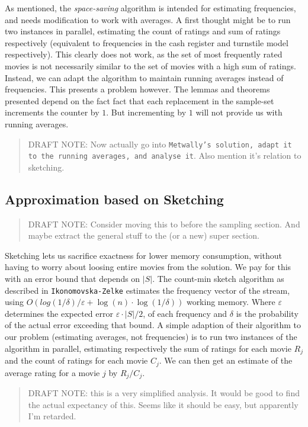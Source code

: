 As mentioned, the \textit{space-saving} algorithm is intended for
estimating frequencies, and needs modification to work with averages. A first
thought might be to run two instances in parallel, estimating the count of
ratings and sum of ratings respectively (equivalent to frequencies in the cash
register and turnstile model respectively). This clearly does not work, as the
set of most frequently rated movies is not necessarily similar to the set of
movies with a high sum of ratings. Instead, we can adapt the algorithm to
maintain running averages instead of frequencies. This presents a problem
however. The lemmas and theorems presented depend on the fact fact that each
replacement in the sample-set increments the counter by $1$. But incrementing by
$1$ will not provide us with running averages.

\begin{quote}
	DRAFT NOTE: Now actually go into \texttt{Metwally's solution, adapt it
	to the running averages, and analyse it}.
	Also mention it's relation to sketching.
\end{quote}

\subsection*{Approximation based on Sketching}

\begin{quote}
	DRAFT NOTE: Consider moving this to before the sampling section.
	And maybe extract the general stuff to the (or a new) super section.
\end{quote}
Sketching lets us sacrifice exactness for lower memory consumption, without
having to worry about loosing entire movies from the solution. We pay for this
with an error bound that depends on $|S|$.
The count-min sketch algorithm as described in \texttt{Ikonomovska\--Zelke}
estimates the frequency vector of the stream, using
$O(log(1/\delta)/\varepsilon + \log(n) \cdot \log(1/\delta))$ working memory.
Where $\varepsilon$ determines the expected error $\varepsilon \cdot |S| /2$, of
each frequency and $\delta$ is the probability of the actual error exceeding
that bound. A simple adaption of their algorithm to our problem (estimating
averages, not frequencies) is to run two instances of the algorithm in parallel,
estimating respectively the sum of ratings for each movie $R_j$ and the count of ratings for
each movie $C_j$. We can then get an estimate of the average rating for a movie
$j$ by $R_j/C_j$.


\begin{quote}
	DRAFT NOTE: this is a very simplified analysis.
	It would be good to find the actual expectancy of this. Seems like it
	should be easy, but apparently I'm retarded.
\end{quote}
